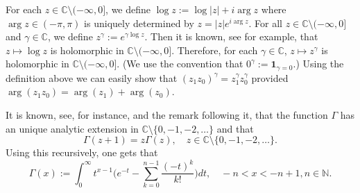 \documentclass[12pt,a4paper]{amsart}
\theoremstyle{plain}
\theoremstyle{definition}
\numberwithin{equation}{section}
\begin{document}
For each $z\in \mathbb C\setminus (-\infty,0]$, we define
$
\log z := \log |z| + i \arg z
$
where $\arg z \in (-\pi,\pi)$ is uniquely determined by
$
z = |z|e^{i \arg z}.
$ 	
For all $z\in \mathbb C\setminus (-\infty,0]$ and $\gamma \in \mathbb C$, we define
$
z^\gamma := e^{\gamma \log z}.
$
Then it is known, see \cite[Theorem 6.1]{SteinShakarchi2003Complex} for example, that $z\mapsto \log z$ is holomorphic in $\mathbb C\setminus (-\infty,0]$.
Therefore, for each $\gamma \in \mathbb C$, $z\mapsto z^\gamma$ is holomorphic in $\mathbb C\setminus (-\infty,0]$. (We use the convention that  $0^\gamma := \mathbf 1_{\gamma = 0}$.)
Using the definition above we can easily show that $(z_1z_0)^\gamma = z_1^\gamma z_0^\gamma$ provided $\arg (z_1z_0)=\arg (z_1) + \arg(z_0)$.

It is known, see, for instance, \cite[Theorem 6.1.3]{SteinShakarchi2003Complex} and the remark following it, that the function $\Gamma$ has an unique analytic extension in $\mathbb C\setminus\{0, -1,-2,\dots\}$ and that
\[
	\Gamma(z+1) = z \Gamma(z),\quad z\in \mathbb C\setminus\{0, -1,-2,\dots\}.
\]
Using this recursively, one gets that
\begin{equation}
  \label{eq: definition of Gamma function}
  \Gamma(x)
  := \int_0^\infty t^{x-1} \Big(e^{-t} - \sum_{k=0}^{n-1} \frac{(-t)^k}{k!}\Big) dt,
  \quad -n< x< -n+1, n\in \mathbb N.
\end{equation}
\end{document}
